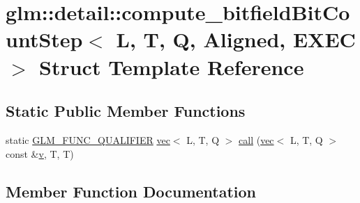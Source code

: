 \hypertarget{structglm_1_1detail_1_1compute__bitfield_bit_count_step}{}\section{glm\+:\+:detail\+:\+:compute\+\_\+bitfield\+Bit\+Count\+Step$<$ L, T, Q, Aligned, E\+X\+EC $>$ Struct Template Reference}
\label{structglm_1_1detail_1_1compute__bitfield_bit_count_step}
\subsection*{Static Public Member Functions}
\begin{DoxyCompactItemize}
\item 
static \mbox{\hyperlink{setup_8hpp_a33fdea6f91c5f834105f7415e2a64407}{G\+L\+M\+\_\+\+F\+U\+N\+C\+\_\+\+Q\+U\+A\+L\+I\+F\+I\+ER}} \mbox{\hyperlink{structglm_1_1vec}{vec}}$<$ L, T, Q $>$ \mbox{\hyperlink{structglm_1_1detail_1_1compute__bitfield_bit_count_step_a6dd989f9de4e8dbe2af6cf3cae352778}{call}} (\mbox{\hyperlink{structglm_1_1vec}{vec}}$<$ L, T, Q $>$ const \&\mbox{\hyperlink{_s_d_l__opengl_8h_a10a82eabcb59d2fcd74acee063775f90}{v}}, T, T)
\end{DoxyCompactItemize}


\subsection{Member Function Documentation}
\mbox{\label{structglm_1_1detail_1_1compute__bitfield_bit_count_step_a6dd989f9de4e8dbe2af6cf3cae352778}} 
